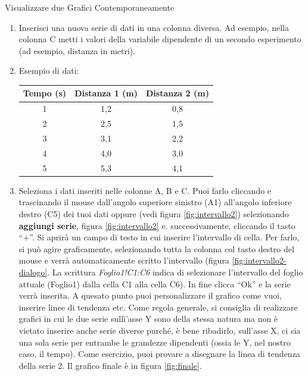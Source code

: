 \documentclass[12pt,a4paper,oneside]{book}
\makeatletter
\renewcommand{\subsection}{\@startsection {subsection}{2}{\z@}
{-3ex \@plus -0.1ex \@minus -.4ex}
{0.5ex \@plus.2ex }
{\color[rgb]{0.141,0.596,0.749}\normalfont\sffamily\bfseries}}
\theoremstyle{esercizio}
\makeatother
\begin{document}
\subsection{Visualizzare due Grafici Contemporaneamente}
\begin{enumerate}
    \item Inserisci una nuova serie di dati in una colonna diversa. Ad esempio, nella colonna C metti i valori della variabile dipendente di un secondo esperimento (ad esempio, distanza in metri).
    \item Esempio di dati:
    \begin{center}
    \begin{tabular}{|c|c|c|}
    \hline
    Tempo (s) & Distanza 1 (m) & Distanza 2 (m) \\
    \hline
    1 & 1,2 & 0,8 \\
    2 & 2,5 & 1,5 \\
    3 & 3,1 & 2,2 \\
    4 & 4,0 & 3,0 \\
    5 & 5,3 & 4,1 \\
    \hline
    \end{tabular}
    \end{center}
    \item Seleziona i dati inseriti nelle colonne A, B e C. Puoi farlo cliccando e trascinando il mouse dall'angolo superiore sinistro (A1) all'angolo inferiore destro (C5) dei tuoi dati oppure (vedi figura \ref{fig:intervallo2}) selezionando \textbf{aggiungi serie}, figura \ref{fig:intervallo2} e. successivamente, cliccando il tasto ``+''. Si aprirà un campo di testo in cui inserire l'intervallo di cella. Per farlo, si può agire graficamente, selezionando tutta la colonna col tasto destro del mouse e verrà automaticamente scritto l'intervallo (figura \ref{fig:intervallo2-dialogo}. La scrittura \textit{Foglio1!C1:C6} indica di selezionare l'intervallo del foglio attuale (Foglio1) dalla cella C1 alla cella C6). In fine clicca ``Ok'' e la serie verrà inserita. A quesato punto puoi personalizzare il grafico come vuoi, inserire linee di tendenza etc. Come regola generale, si consiglia di realizzare grafici in cui le due serie sullì'asse Y sono della stessa natura ma non è vietato inserire anche serie diverse purché, è bene ribadirlo, sull'asse X, ci sia una sola serie per entrambe le grandezze dipendenti (ossia le Y, nel nostro caso, il tempo). Come esercizio, puoi provare a disegnare la linea di tendenza della serie 2. Il grafico finale è in figura \ref{fig:finale}.
    

\end{enumerate}
\end{document}
